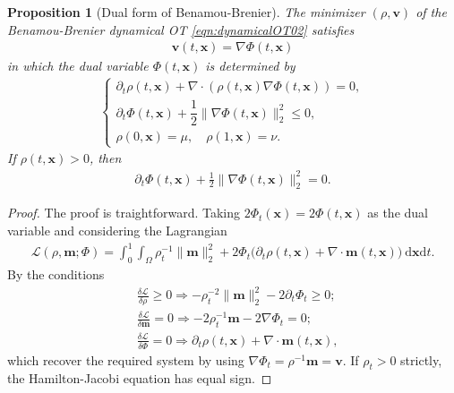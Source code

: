 \documentclass[11pt]{book}
\newtheorem{proposition}[theorem]{Proposition}
\newcommand{\dx}{\mathrm{d}\mathbf{x}}
\newcommand{\dt}{\mathrm{d}t}
\begin{document}
\begin{proposition}[Dual form of Benamou-Brenier]
    The minimizer $(\rho,\mathbf{v})$ of the Benamou-Brenier dynamical OT \eqref{eqn:dynamicalOT02} satisfies
    \begin{align*}
        \mathbf{v}(t,\mathbf{x}) = \nabla\Phi(t,\mathbf{x})
    \end{align*}
    in which the dual variable $\Phi(t,\mathbf{x})$ is determined by
    \begin{align}\label{eqn:BB_dualsystem}
        \begin{cases}
         \partial_t\rho(t,\mathbf{x}) + \nabla\cdot(\rho(t,\mathbf{x})\nabla\Phi(t,\mathbf{x})) = 0, \\
         \partial_t\Phi(t,\mathbf{x}) + \dfrac{1}{2}\|\nabla\Phi(t,\mathbf{x})\|_2^2 \le 0, \\
         \rho(0,\mathbf{x}) = \mu, \quad \rho(1,\mathbf{x}) = \nu.
        \end{cases}
      \end{align}
      If $\rho(t,\mathbf{x})>0$, then 
      \begin{align}\label{eqn:HJ02}
        \partial_t\Phi(t,\mathbf{x}) + \frac{1}{2}\|\nabla\Phi(t,\mathbf{x})\|_2^2 = 0.
      \end{align}
\end{proposition}
\begin{proof}
    The proof is traightforward. Taking $2\Phi_t(\mathbf{x}) = 2\Phi(t,\mathbf{x})$ as the dual variable and considering the Lagrangian
    \begin{align*}
        \mathcal{L}(\rho,\mathbf{m};\Phi) = \int_0^1\int_{\Omega} \rho_t^{-1}\|\mathbf{m}\|_2^2 + 2\Phi_t\Big(\partial_t\rho(t,\mathbf{x})+\nabla\cdot\mathbf{m}(t,\mathbf{x})\Big)\ \dx\dt.
    \end{align*}
    By the conditions
    \begin{align*}
        &\frac{\delta \mathcal{L}}{\delta \rho}\ge0 \Longrightarrow -\rho_t^{-2}\|\mathbf{m}\|_2^2 - 2\partial_t\Phi_t \ge 0 ; \\
        &\frac{\delta \mathcal{L}}{\delta \mathbf{m}}=0 \Longrightarrow -2\rho_t^{-1}\mathbf{m} -2 \nabla\Phi_t = 0; \\
        &\frac{\delta \mathcal{L}}{\delta \Phi}=0 \Longrightarrow \partial_t\rho(t,\mathbf{x})+\nabla\cdot\mathbf{m}(t,\mathbf{x}),
    \end{align*}
    which recover the required system by using $\nabla\Phi_t = \rho^{-1}\mathbf{m} = \mathbf{v}$. If $\rho_t >0$ strictly, the Hamilton-Jacobi equation has equal sign.
\end{proof}
\end{document}
